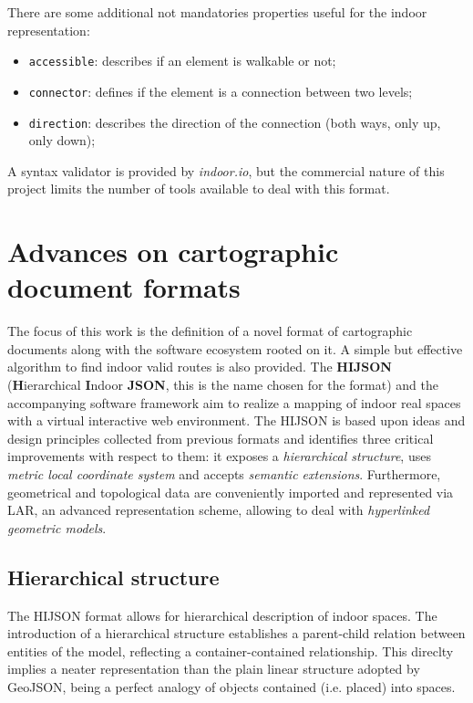\documentclass{sig-alternate}
\begin{document}
There are some additional not mandatories properties useful for
the indoor representation:

\begin{itemize}
\itemsep1pt\parskip0pt
\item
 \texttt{accessible}: describes if an element is walkable or not;
\item
 \texttt{connector}: defines if the element is a connection between two
 levels;
\item
 \texttt{direction}: describes the direction of the connection (both
 ways, only up, only down);
\end{itemize}

A syntax validator is provided by \emph{indoor.io}, but the commercial nature
of this project limits the number of tools available to deal with this
format.

\section{Advances on cartographic document formats}\label{advances-on-cartographic-document-format}

The focus of this work is the definition of a novel format of cartographic
documents along with the software ecosystem rooted on it. A simple but
effective algorithm to find indoor valid routes is also provided. The
\textbf{HIJSON} (\textbf{H}ierarchical \textbf{I}ndoor \textbf{JSON}, this is
the name chosen for the format) and the accompanying software framework aim
to realize a mapping of indoor real spaces with a virtual interactive web
environment. The HIJSON is based upon ideas and design principles collected
from previous formats and identifies three critical improvements with respect
to them: it exposes a \emph{hierarchical structure}, uses \emph{metric local
coordinate system} and accepts \emph{semantic extensions}. Furthermore, geometrical 
and topological data are conveniently imported and represented via LAR, an advanced 
representation scheme, allowing to deal with \emph{hyperlinked geometric models}.

\subsection{Hierarchical structure}\label{hierarchical-structure}

The HIJSON format allows for hierarchical description of indoor spaces. The
introduction of a hierarchical structure establishes a parent-child relation
between entities of the model, reflecting a container-contained relationship.
This direclty implies a neater representation than the plain linear structure
adopted by GeoJSON, being a perfect analogy of objects contained (i.e.
placed) into spaces.
\end{document}

